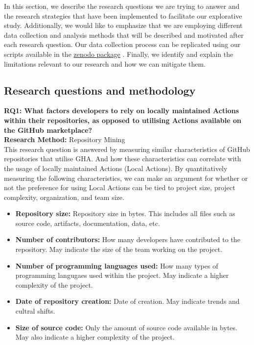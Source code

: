 \documentclass[conference]{IEEEtran}
\begin{document}
    In this section, we describe the research questions we are trying to answer and the research strategies that have been implemented to facilitate our explorative study. Additionally, we would like to emphasize that we are employing different data collection and analysis methods that will be described and motivated after each research question. Our data collection process can be replicated using our scripts available in the \href{https://github.com//orgs/community/discussions/43861} {zenodo package}\cite{Marof2024} . Finally, we identify and explain the limitations relevant to our research and how we can mitigate them. 

    \subsection{Research questions and methodology}
        \textbf{RQ1: What factors developers to rely on locally maintained Actions within their repositories, as opposed to utilising Actions available on the GitHub marketplace?}
        \\

        \textbf{Research Method:}  Repository Mining \\
          This research question is answered by measuring similar characteristics of GitHub repositories that utilise GHA. And how these characteristics can correlate with the usage of locally maintained Actions (Local Actions). By quantitatively measuring the following characteristics, we can make an argument for whether or not the preference for using Local Actions can be tied to project size, project complexity, organization, and team size. \\
          \begin{itemize}
            \item \textbf{Repository size:} Repository size in bytes. This includes all files such as source code, artifacts, documentation, data, etc.
            \item \textbf{Number of contributors:} How many developers have contributed to the repository. May indicate the size of the team working on the project.
            \item	\textbf{Number of programming languages used:} How many types of programming langugaes used within the project. May indicate a higher complexity of the project.
            \item \textbf{Date of repository creation:} Date of creation. May indicate trends and cultral shifts.\\
            \item \textbf{Size of source code:} Only the amount of source code available in bytes. May also indicate a higher complexity of the project. \\
          \end{itemize}
          
\end{document}
